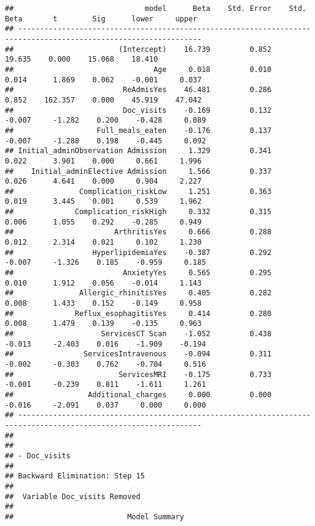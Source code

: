\documentclass[
]{article}
\begin{document}
\begin{verbatim}
##                              model      Beta    Std. Error    Std. Beta       t        Sig      lower     upper 
## ----------------------------------------------------------------------------------------------------------------
##                        (Intercept)    16.739         0.852                  19.635    0.000    15.068    18.410 
##                                Age     0.018         0.010        0.014      1.869    0.062    -0.001     0.037 
##                         ReAdmisYes    46.481         0.286        0.852    162.357    0.000    45.919    47.042 
##                         Doc_visits    -0.169         0.132       -0.007     -1.282    0.200    -0.428     0.089 
##                   Full_meals_eaten    -0.176         0.137       -0.007     -1.288    0.198    -0.445     0.092 
## Initial_adminObservation Admission     1.329         0.341        0.022      3.901    0.000     0.661     1.996 
##    Initial_adminElective Admission     1.566         0.337        0.026      4.641    0.000     0.904     2.227 
##               Complication_riskLow     1.251         0.363        0.019      3.445    0.001     0.539     1.962 
##              Complication_riskHigh     0.332         0.315        0.006      1.055    0.292    -0.285     0.949 
##                       ArthritisYes     0.666         0.288        0.012      2.314    0.021     0.102     1.230 
##                  HyperlipidemiaYes    -0.387         0.292       -0.007     -1.326    0.185    -0.959     0.185 
##                         AnxietyYes     0.565         0.295        0.010      1.912    0.056    -0.014     1.143 
##               Allergic_rhinitisYes     0.405         0.282        0.008      1.433    0.152    -0.149     0.958 
##              Reflux_esophagitisYes     0.414         0.280        0.008      1.479    0.139    -0.135     0.963 
##                    ServicesCT Scan    -1.052         0.438       -0.013     -2.403    0.016    -1.909    -0.194 
##                ServicesIntravenous    -0.094         0.311       -0.002     -0.303    0.762    -0.704     0.516 
##                        ServicesMRI    -0.175         0.733       -0.001     -0.239    0.811    -1.611     1.261 
##                 Additional_charges     0.000         0.000       -0.016     -2.091    0.037     0.000     0.000 
## ----------------------------------------------------------------------------------------------------------------
## 
## 
## - Doc_visits 
## 
## Backward Elimination: Step 15 
## 
##  Variable Doc_visits Removed 
## 
##                          Model Summary                          

\end{verbatim}
\end{document}
